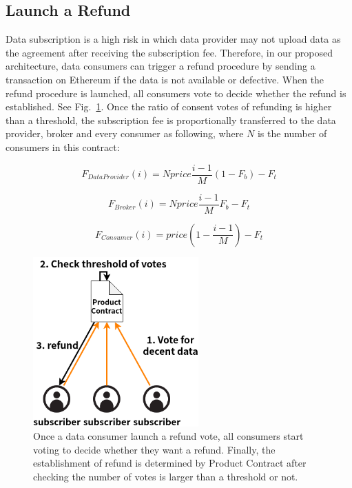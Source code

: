 \begin{spacing}{2.0}
\section{Launch a Refund}
\label{section:refund}
Data subscription is a high risk in which data provider may not upload data as the agreement after receiving the subscription fee. Therefore, in our proposed architecture, data consumers can trigger a refund procedure by sending a transaction on Ethereum if the data is not available or defective. When the refund procedure is launched, all consumers vote to decide whether the refund is established. See Fig.~\ref{fig:refund}. Once the ratio of consent votes of refunding is higher than a threshold, the subscription fee is proportionally transferred to the data provider, broker and every consumer as following, where $N$ is the number of consumers in this contract:


\begin{equation}
    F_{DataProvider}(i) = Nprice \frac{i-1}{M} (1-F_{b}) -F_{t}
\end{equation}

\begin{equation}
    F_{Broker}(i) = Nprice \frac{i-1}{M} F_{b} -F_{t}
\end{equation}

\begin{equation}
    F_{Consumer}(i) = price (1-\frac{i-1}{M}) -F_{t}
\end{equation}

\begin{figure}[h]
    \centering
    \includegraphics[width=2.5in]{img/refund}
    \caption{Once a data consumer launch a refund vote, all consumers start voting to decide whether they want a refund. Finally, the establishment of refund is determined by Product Contract after checking the number of votes is larger than a threshold or not.}
    \label{fig:refund}
\end{figure}


\end{spacing}
